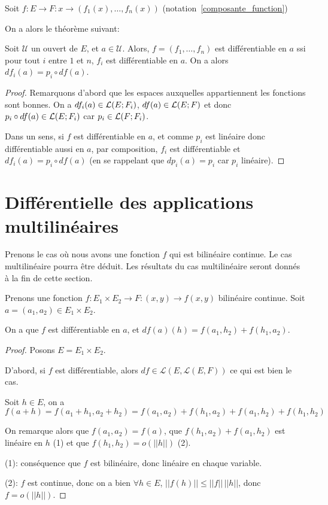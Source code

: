 Soit $f : E \rightarrow F : x \rightarrow (f_{1}(x), \ldots, f_{n}(x))$
(notation~\ref{composante_function})

On a alors le théorème suivant:

\begin{theorem}
\label{differential_composante}
	Soit $\mathcal{U}$ un ouvert de $E$, et $a \in \mathcal{U}$. Alors,
	$f = (f_{1}, \ldots, f_{n})$ est différentiable en $a$ ssi pour tout $i$
	entre $1$ et $n$, $f_{i}$ est différentiable en $a$. On a alors $df_{i}(a) =
	p_{i} \circ df(a)$.
\end{theorem}

\ifdefined\outputproof
\begin{proof}
	Remarquons d'abord que les espaces auxquelles appartiennent les fonctions
	sont bonnes. On a $df_{i}(a) \in \mathcal{L}(E; F_{i})$, $df(a) \in
	\mathcal{L}(E; F)$ et donc $p_{i} \circ df(a) \in
	\mathcal{L}(E; F_{i})$ car $p_{i} \in
	\mathcal{L}(F; F_{i})$.

	Dans un sens, si $f$ est différentiable en $a$, et comme $p_{i}$ est
	linéaire donc différentiable aussi en $a$, par composition, $f_{i}$ est
	différentiable et $df_{i}(a) = p_{i} \circ df(a)$ (en se rappelant que
	$dp_{i}(a) = p_{i}$ car $p_{i}$ linéaire).
\end{proof}
\fi

\section{Différentielle des applications multilinéaires}

Prenons le cas où nous avons une fonction $f$ qui est bilinéaire continue. Le cas
multilinéaire pourra être déduit. Les résultats du cas multilinéaire seront
donnés à la fin de cette section.

\begin{proposition}
\label{bilinear_differential_application}
Prenons une fonction $f : E_{1} \times E_{2} \rightarrow F : (x, y) \rightarrow
f(x, y)$ bilinéaire continue. Soit $a = (a_{1}, a_{2}) \in E_{1} \times E_{2}$.

On a que $f$ est différentiable en $a$, et $df(a)(h) = f(a_{1}, h_{2}) +
f(h_{1}, a_{2})$.
\end{proposition}

\ifdefined\outputproof
\begin{proof}
	Posons $E = E_{1} \times E_{2}$.

	D'abord, si $f$ est différentiable, alors $df \in
	\mathcal{L}(E, \mathcal{L}(E, F))$ ce qui est bien
	le cas.

	Soit $h \in E$, on a
	$f(a + h) = f(a_{1} + h_{1}, a_{2} + h_{2}) =
	f(a_{1}, a_{2}) + f(h_{1}, a_{2}) + f(a_{1}, h_{2}) + f(h_{1}, h_{2})$

	On remarque alors que $f(a_{1}, a_{2}) = f(a)$, que $f(h_{1}, a_{2}) +
	f(a_{1}, h_{2})$ est linéaire en $h$ (1) et que $f(h_{1}, h_{2}) = o(||h||)$
	(2).

	(1): conséquence que $f$ est bilinéaire, donc linéaire en chaque variable.

	(2): $f$ est continue, donc on a bien $\forall h \in E$, $||f(h)|| \leq
	||f|| \, ||h||$, donc $f = o(||h||)$.
\end{proof}
\fi

